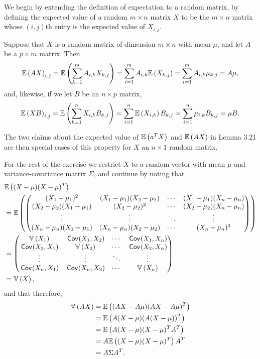 \begin{ex}
  We begin by extending the definition of expectation to a random matrix, by
  defining the expected value of a random $m\times n$ matrix $X$ to be the
  $m\times n$ matrix whose $(i, j)$th entry is the expected value of $X_{i,j}$.

  Suppose that $X$ is a random matrix of dimension $m\times n$ with mean $\mu$,
  and let $A$ be a $p\times m$ matrix. Then
  \[
    \mathbb{E}\left(AX\right)_{i,j}
    =\mathbb{E}\left(\sum_{k=1}^m A_{i,k} X_{k,j}\right)
    =\sum_{i=1}^m A_{i,k}\mathbb{E}\left(X_{k,j}\right)
    =\sum_{i=1}^m A_{i,k}\mu_{k,j}
    =A\mu,
  \]
  and, likewise, if we let $B$ be an $n\times p$ matrix,
  \[
    \mathbb{E}\left(XB\right)_{i,j}
    =\mathbb{E}\left(\sum_{k=1}^n X_{i,k} B_{k,j}\right)
    =\sum_{i=1}^n \mathbb{E}\left(X_{i,k}\right)B_{k,j}
    =\sum_{i=1}^n \mu_{i,k}B_{k,j}
    =\mu B.
  \]

  The two claims about the expected value of $\mathbb{E}\left(a^TX\right)$ and $\mathbb{E}\left(AX\right)$ in Lemma
  3.21 are then special cases of this property for $X$ an $n\times 1$ random
  matrix.

  For the rest of the exercise we restrict $X$ to a random vector with mean
  $\mu$ and variance-covariance matrix $\Sigma$, and continue by noting that
  \begin{align*}
     & \mathbb{E}\left((X-\mu)(X-\mu)^T\right)            \\
     & =\mathbb{E}\left(\begin{pmatrix}
        (X_1-\mu_1)^2          & (X_1-\mu_1)(X_2-\mu_2) & \cdots & (X_1-\mu_1)(X_n-\mu_n) \\
        (X_2-\mu_2)(X_1-\mu_1) & (X_2-\mu_2)^2          & \cdots & (X_2-\mu_2)(X_n-\mu_n) \\
        \vdots                 & \vdots                 & \ddots & \vdots                 \\
        (X_n-\mu_n)(X_1-\mu_1) & (X_n-\mu_n)(X_2-\mu_2) & \cdots & (X_n-\mu_n)^2          \\
      \end{pmatrix}\right) \\
     & =\begin{pmatrix}
      \mathbb{V}\left(X_1\right)      & \,\textsf{Cov}\mkern-2mu\left(X_1, X_2 \right) & \cdots & \,\textsf{Cov}\mkern-2mu\left(X_1,X_n \right) \\
      \,\textsf{Cov}\mkern-2mu\left(X_2,X_1 \right)  & \mathbb{V}\left(X_2\right)      & \cdots & \,\textsf{Cov}\mkern-2mu\left(X_2,X_n \right) \\
      \vdots         & \vdots         & \ddots & \vdots        \\
      \,\textsf{Cov}\mkern-2mu\left(X_n, X_1 \right) & \,\textsf{Cov}\mkern-2mu\left(X_n, X_2 \right) & \cdots & \mathbb{V}\left(X_n\right)     \\
    \end{pmatrix}     \\
     & =\mathbb{V}\left(X\right),
  \end{align*}
  and that therefore,
  \begin{align*}
    \mathbb{V}\left(AX\right)
     & =\mathbb{E}\left((AX-A\mu)(AX-A\mu)^T\right) \\
     & =\mathbb{E}\left(A(X-\mu)(A(X-\mu))^T\right) \\
     & =\mathbb{E}\left(A(X-\mu)(X-\mu)^TA^T\right) \\
     & =A\mathbb{E}\left((X-\mu)(X-\mu)^T\right)A^T \\
     & =A\Sigma A^T.
  \end{align*}


\end{ex}
